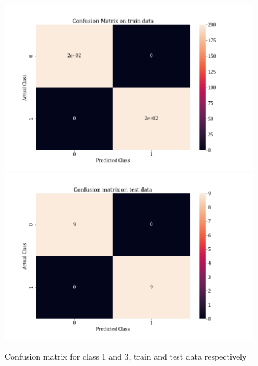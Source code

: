 \documentclass[11pt,a4paper]{article}
\begin{document}
\begin{figure}[H]
\centering
\includegraphics[scale=0.4]{images/1A_ovo_conf13_train.png}
\includegraphics[scale=0.4]{images/1A_ovo_conf13_test.png}
\caption{Confusion matrix for class 1 and 3, train and test data respectively}
\end{figure}
\end{document}
